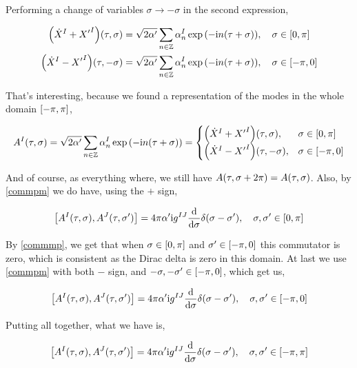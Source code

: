 Performing a change of variables $\sigma\rightarrow-\sigma$ in the second expression,

\begin{align*}
    \qty({\dot X}^I+{X'}^I)\qty(\tau,\sigma)&=\sqrt{2\alpha'}\sum\limits_{n\in\mathbb Z}\alpha_n^I\exp\qty(-\im n\qty(\tau+ \sigma)),\ \ \ \sigma\in\qty[0,\pi]\\
    \qty({\dot X}^I-{X'}^I)\qty(\tau,-\sigma)&=\sqrt{2\alpha'}\sum\limits_{n\in\mathbb Z}\alpha_n^I\exp\qty(-\im n\qty(\tau+\sigma)),\ \ \ \sigma\in\qty[-\pi,0]
\end{align*}

That's interesting, because we found a representation of the modes in the whole domain $\qty[-\pi,\pi]$,

\begin{align*}
    A^I\qty(\tau,\sigma)=\sqrt{2\alpha'}\sum\limits_{n\in\mathbb Z}\alpha_n^I\exp\qty(-\textnormal{i} n\qty(\tau+ \sigma))=\begin{cases}
        \qty({\dot X}^I+{X'}^I)\qty(\tau,\sigma),& \sigma\in\qty[0,\pi]\\
        \qty({\dot X}^I-{X'}^I)\qty(\tau,-\sigma),& \sigma\in\qty[-\pi,0]
    \end{cases}
\end{align*}

And of course, as everything where, we still have $A\qty(\tau,\sigma+2\pi)=A\qty(\tau,\sigma)$. Also, by \ref{commpm} we do have, using the $+$ sign,

\begin{align*}
    \comm{A^I\qty(\tau,\sigma)}{A^J\qty(\tau,\sigma')}=4\pi\alpha'\im g^{IJ}\dv{}{\sigma}\delta\qty(\sigma-\sigma'),\ \ \ \sigma,\sigma'\in\qty[0,\pi]
\end{align*}

By \ref{commmp}, we get that when $\sigma\in\qty[0,\pi]$ and $\sigma'\in\qty[-\pi,0]$ this commutator is zero, which is consistent as the Dirac delta is 
zero in this domain. At last we use \ref{commpm} with both $-$ sign, and $-\sigma,-\sigma'\in\qty[-\pi,0]$, which get us,

\begin{align*}
    \comm{A^I\qty(\tau,\sigma)}{A^J\qty(\tau,\sigma')}=4\pi\alpha'\im g^{IJ}\dv{}{\sigma}\delta\qty(\sigma-\sigma'),\ \ \ \sigma,\sigma'\in\qty[-\pi,0]
\end{align*}

Putting all together, what we have is,

\begin{align*}
    \comm{A^I\qty(\tau,\sigma)}{A^J\qty(\tau,\sigma')}=4\pi\alpha'\im g^{IJ}\dv{}{\sigma}\delta\qty(\sigma-\sigma'),\ \ \ \sigma,\sigma'\in\qty[-\pi,\pi]
\end{align*}

